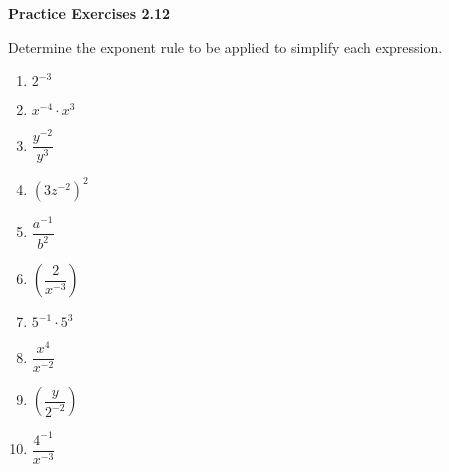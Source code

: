 \vspace{1ex}
\noindent\textbf{Practice Exercises 2.12}

\vspace{0.75ex}

Determine the exponent rule to be applied to simplify each expression.
\begin{multicols}{2}
\begin{enumerate}[noitemsep, label = \color{blue}\arabic*. ]
    \item \( 2^{-3} \)
    \item \( x^{-4} \cdot x^3 \)
    \item \( \dfrac{y^{-2}}{y^3} \)
    \item \( (3z^{-2})^2 \)
    \item \( \dfrac{a^{-1}}{b^2} \)
    \item \( \left( \dfrac{2}{x^{-3}} \right) \)
    \item \( 5^{-1} \cdot 5^3 \)
    \item \( \dfrac{x^4}{x^{-2}} \)
    \item \( \left( \dfrac{y}{2^{-2}} \right) \)
    \item \( \dfrac{4^{-1}}{x^{-3}} \)
\end{enumerate}
\end{multicols}
